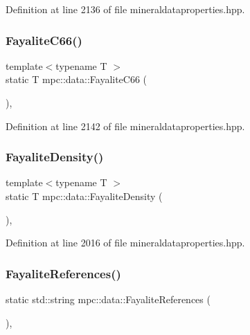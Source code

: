 Definition at line 2136 of file mineraldataproperties.\+hpp.

\mbox{\label{namespacempc_1_1data_abc0687dd7a4a06165d6b81189e8bd786}} 
\subsubsection{\texorpdfstring{Fayalite\+C66()}{FayaliteC66()}}
{\footnotesize\ttfamily template$<$typename T $>$ \\
static T mpc\+::data\+::\+Fayalite\+C66 (\begin{DoxyParamCaption}{ }\end{DoxyParamCaption})\hspace{0.3cm}{\ttfamily [inline]}, {\ttfamily [static]}}



Definition at line 2142 of file mineraldataproperties.\+hpp.

\mbox{\label{namespacempc_1_1data_a167621694a2b6f1f86573c0cf98a988b}} 
\subsubsection{\texorpdfstring{Fayalite\+Density()}{FayaliteDensity()}}
{\footnotesize\ttfamily template$<$typename T $>$ \\
static T mpc\+::data\+::\+Fayalite\+Density (\begin{DoxyParamCaption}{ }\end{DoxyParamCaption})\hspace{0.3cm}{\ttfamily [inline]}, {\ttfamily [static]}}



Definition at line 2016 of file mineraldataproperties.\+hpp.

\mbox{\label{namespacempc_1_1data_ac42b5bd7a3f15a61696037d79a1fad40}} 
\subsubsection{\texorpdfstring{Fayalite\+References()}{FayaliteReferences()}}
{\footnotesize\ttfamily static std\+::string mpc\+::data\+::\+Fayalite\+References (\begin{DoxyParamCaption}{ }\end{DoxyParamCaption})\hspace{0.3cm}{\ttfamily [inline]}, {\ttfamily [static]}}



